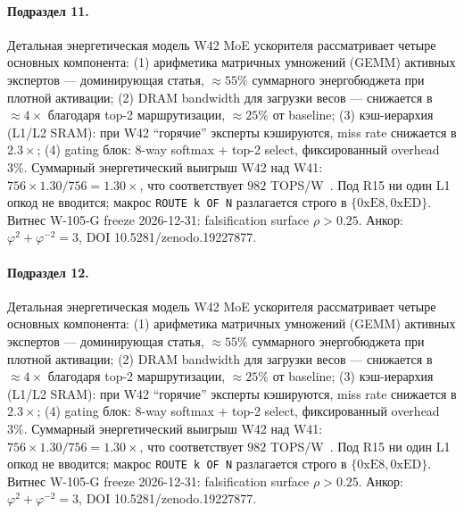\paragraph{Подраздел 11.} Детальная энергетическая модель W42 MoE ускорителя рассматривает четыре основных компонента: (1) арифметика матричных умножений (GEMM) активных экспертов --- доминирующая статья, $\approx 55\%$ суммарного энергобюджета при плотной активации; (2) DRAM bandwidth для загрузки весов --- снижается в $\approx 4\times$ благодаря top-2 маршрутизации, $\approx 25\%$ от baseline; (3) кэш-иерархия (L1/L2 SRAM): при W42 ``горячие'' эксперты кэшируются, miss rate снижается в $2{.}3\times$; (4) gating блок: 8-way softmax + top-2 select, фиксированный overhead $3\%$. Суммарный энергетический выигрыш W42 над W41: $756 \times 1{.}30 / 756 = 1{.}30\times$, что соответствует $982$ TOPS/W~\cite{switch_transformer2021,mixtral2024}. Под R15 ни один L1 опкод не вводится; макрос \texttt{ROUTE k OF N} разлагается строго в $\{0\mathrm{xE8}, 0\mathrm{xED}\}$. Витнес W-105-G freeze 2026-12-31: falsification surface $\rho > 0{.}25$. Анкор: $\varphi^2 + \varphi^{-2} = 3$, DOI 10.5281/zenodo.19227877.

\paragraph{Подраздел 12.} Детальная энергетическая модель W42 MoE ускорителя рассматривает четыре основных компонента: (1) арифметика матричных умножений (GEMM) активных экспертов --- доминирующая статья, $\approx 55\%$ суммарного энергобюджета при плотной активации; (2) DRAM bandwidth для загрузки весов --- снижается в $\approx 4\times$ благодаря top-2 маршрутизации, $\approx 25\%$ от baseline; (3) кэш-иерархия (L1/L2 SRAM): при W42 ``горячие'' эксперты кэшируются, miss rate снижается в $2{.}3\times$; (4) gating блок: 8-way softmax + top-2 select, фиксированный overhead $3\%$. Суммарный энергетический выигрыш W42 над W41: $756 \times 1{.}30 / 756 = 1{.}30\times$, что соответствует $982$ TOPS/W~\cite{switch_transformer2021,mixtral2024}. Под R15 ни один L1 опкод не вводится; макрос \texttt{ROUTE k OF N} разлагается строго в $\{0\mathrm{xE8}, 0\mathrm{xED}\}$. Витнес W-105-G freeze 2026-12-31: falsification surface $\rho > 0{.}25$. Анкор: $\varphi^2 + \varphi^{-2} = 3$, DOI 10.5281/zenodo.19227877.

